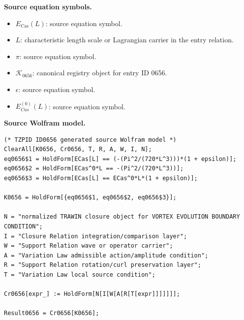 \begin{minipage}[t]{0.49\linewidth}
\begingroup
\small
\raggedright
\textbf{Source equation symbols.}\par
\begin{itemize}[leftmargin=1.35em,itemsep=1pt,topsep=1pt,parsep=0pt]
    \item $E_{\mathrm{Cas}}(L)$: source equation symbol.
    \item $L$: characteristic length scale or Lagrangian carrier in the entry relation.
    \item $\pi$: source equation symbol.
    \item $\mathcal{K}_{0656}$: canonical registry object for entry ID 0656.
    \item $\epsilon$: source equation symbol.
    \item $E_{Cas}^{(0)}(L)$: source equation symbol.
\end{itemize}
\endgroup
\end{minipage}\hfill
\begin{minipage}[t]{0.47\linewidth}
\begingroup
\scriptsize
\raggedright
\textbf{Source Wolfram model.}\par
\begin{Verbatim}[fontsize=\tiny,breaklines=true,breakanywhere=true]
(* TZPID ID0656 generated source Wolfram model *)
ClearAll[K0656, Cr0656, T, R, A, W, I, N];
eq0656$1 = HoldForm[ECas[L] == (-(Pi^2/(720*L^3)))*(1 + epsilon)];
eq0656$2 = HoldForm[ECas^0*L == -(Pi^2/(720*L^3))];
eq0656$3 = HoldForm[ECas[L] == ECas^0*L*(1 + epsilon)];

K0656 = HoldForm[{eq0656$1, eq0656$2, eq0656$3}];

N = "normalized TRAWIN closure object for VORTEX EVOLUTION BOUNDARY CONDITION";
I = "Closure Relation integration/comparison layer";
W = "Support Relation wave or operator carrier";
A = "Variation Law admissible action/amplitude condition";
R = "Support Relation rotation/curl preservation layer";
T = "Variation Law local source condition";

Cr0656[expr_] := HoldForm[N[I[W[A[R[T[expr]]]]]]];

Result0656 = Cr0656[K0656];
\end{Verbatim}
\endgroup
\end{minipage}

